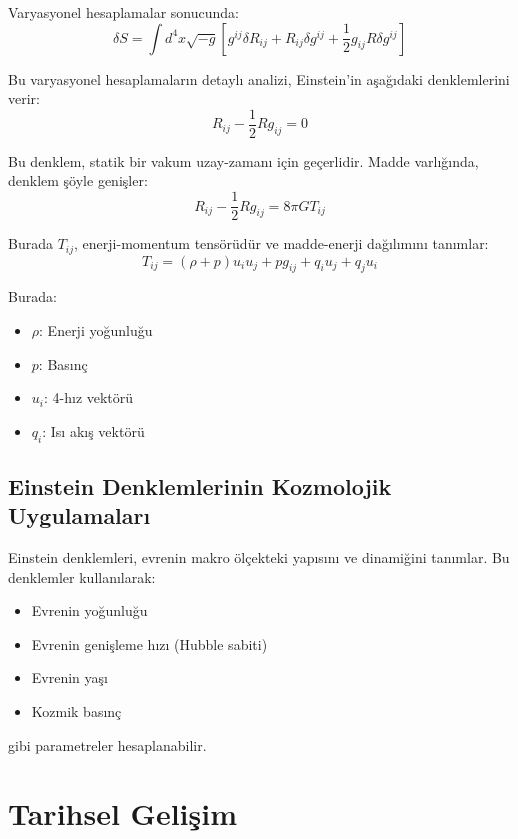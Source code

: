 \documentclass[11pt,letterpaper,twocolumn]{fenbil}
\begin{document}
Varyasyonel hesaplamalar sonucunda:
\begin{equation}
\delta S = \int d^4x \sqrt{-g} \left[g^{ij}\delta R_{ij} + R_{ij}\delta g^{ij} + \frac{1}{2}g_{ij}R\delta g^{ij}\right]
\end{equation}

Bu varyasyonel hesaplamaların detaylı analizi, Einstein'in aşağıdaki denklemlerini verir:
\begin{equation}
R_{ij} - \frac{1}{2}Rg_{ij} = 0
\end{equation}

Bu denklem, statik bir vakum uzay-zamanı için geçerlidir. Madde varlığında, denklem şöyle genişler:
\begin{equation}
R_{ij} - \frac{1}{2}Rg_{ij} = 8\pi G T_{ij}
\end{equation}

Burada $T_{ij}$, enerji-momentum tensörüdür ve madde-enerji dağılımını tanımlar:
\begin{equation}
T_{ij} = (\rho + p)u_i u_j + pg_{ij} + q_i u_j + q_j u_i
\end{equation}

Burada:
\begin{itemize}
\item $\rho$: Enerji yoğunluğu
\item $p$: Basınç
\item $u_i$: 4-hız vektörü
\item $q_i$: Isı akış vektörü
\end{itemize}

\subsection{Einstein Denklemlerinin Kozmolojik Uygulamaları}

Einstein denklemleri, evrenin makro ölçekteki yapısını ve dinamiğini tanımlar. Bu denklemler kullanılarak:
\begin{itemize}
\item Evrenin yoğunluğu
\item Evrenin genişleme hızı (Hubble sabiti)
\item Evrenin yaşı
\item Kozmik basınç
\end{itemize}
gibi parametreler hesaplanabilir.

\section{Tarihsel Gelişim}
\end{document}
